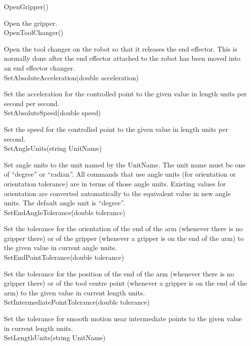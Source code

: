 \sf OpenGripper()\rm

Open the gripper.\\

\sf OpenToolChanger()\rm

Open the tool changer on the robot so that it releases the end effector.
This is normally done after the end effector attached to the robot has
been moved into an end effector changer.\\

\sf SetAbsoluteAcceleration(double acceleration)\rm

Set the acceleration for the controlled point to the given value in
length units per second per second.\\

\sf SetAbsoluteSpeed(double speed)\rm

Set the speed for the controlled point to the given value in length units
per second.\\

\sf SetAngleUnits(string UnitName)\rm

Set angle units to the unit named by the UnitName.
The unit name must be one of ``degree'' or ``radian''. All commands that
use angle units (for orientation or orientation tolerance) are
in terms of those angle units. Existing values for orientation are
converted automatically to the equivalent value in new angle units.
The default angle unit is ``degree''.\\

\sf SetEndAngleTolerance(double tolerance)\rm

Set the tolerance for the orientation of the end of the arm (whenever there
is no gripper there) or of the gripper (whenever a gripper is on the end of
the arm) to the given value in current angle units.\\

\sf SetEndPointTolerance(double tolerance)\rm

Set the tolerance for the position of the end of the arm (whenever there
is no gripper there) or of the tool centre point (whenever a gripper is on
the end of the arm) to the given value in current length units.\\

\sf SetIntermediatePointTolerance(double tolerance)\rm

Set the tolerance for smooth motion near intermediate points to the given
value in current length units.\\

\sf SetLengthUnits(string UnitName)\rm

